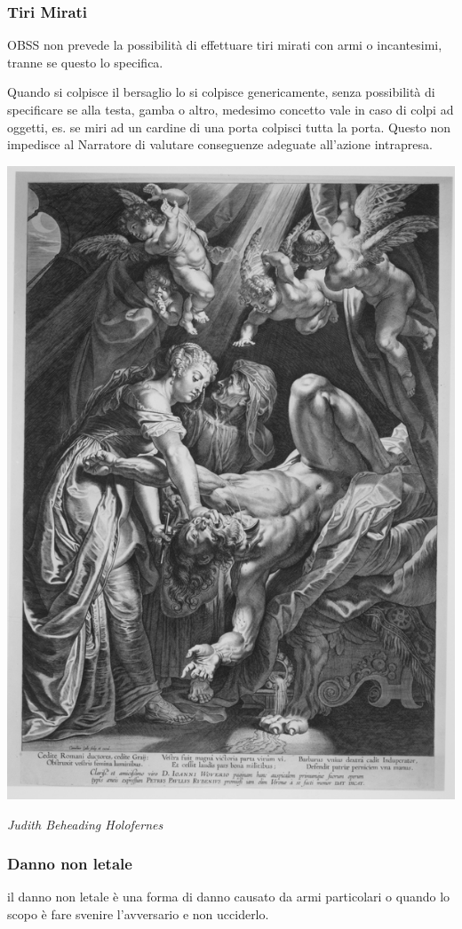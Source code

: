 \begin{multicols}{2}
\subsubsection{Tiri Mirati}\label{tirimirati}

OBSS non prevede la possibilità di effettuare tiri mirati con armi o incantesimi, tranne se questo lo specifica.

Quando si colpisce il bersaglio lo si colpisce genericamente, senza possibilità di specificare se alla testa, gamba o altro, medesimo concetto vale in caso di colpi ad oggetti, es. se miri ad un cardine di una porta colpisci tutta la porta. Questo non impedisce al Narratore di valutare conseguenze adeguate all'azione intrapresa.

\medskip

\begin{center}
	\includegraphics[width=0.6\linewidth]{immagini/Judith_Beheading_Holofernes_MET_MM27116.png}

	\emph{Judith Beheading Holofernes}
\end{center}

\subsubsection{Danno non letale}\label{dannononletale}

il danno non letale è una forma di danno causato da armi particolari o quando lo scopo è fare svenire l'avversario e non ucciderlo.


\end{multicols}
